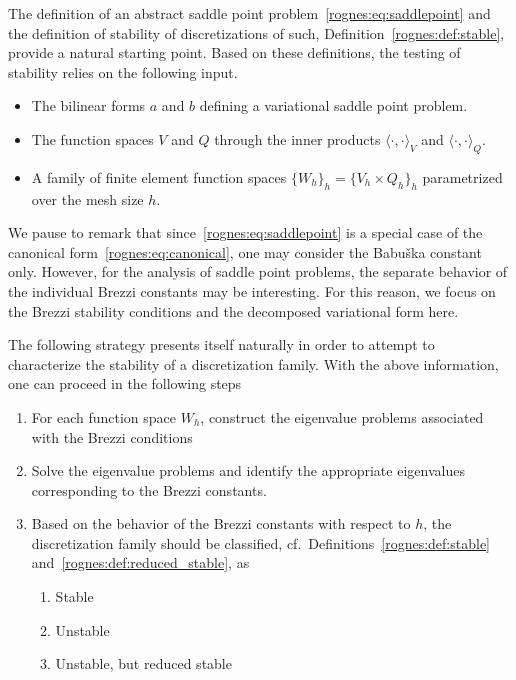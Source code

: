 The definition of an abstract saddle point
problem~\eqref{rognes:eq:saddlepoint} and the definition of stability
of discretizations of such, Definition~\ref{rognes:def:stable},
provide a natural starting point. Based on these definitions, the
testing of stability relies on the following input.
\begin{itemize}
\item The bilinear forms $a$ and $b$ defining a variational
  saddle point problem.
\item The function spaces $V$ and $Q$ through the inner products
  $\langle \cdot, \cdot \rangle_{V}$ and $\langle \cdot, \cdot
  \rangle_{Q}$.
\item A family of finite element function spaces $\{W_h\}_h = \{V_h
  \times Q_h \}_h$ parametrized over the mesh size $h$.
\end{itemize}
We pause to remark that since~\eqref{rognes:eq:saddlepoint} is a special case
of the canonical form~\eqref{rognes:eq:canonical}, one may consider the
Babu\v ska constant only. However, for the analysis of saddle point
problems, the separate behavior of the individual Brezzi constants
may be interesting. For this reason, we focus on the Brezzi stability
conditions and the decomposed variational form here.

The following strategy presents itself naturally in order to attempt
to characterize the stability of a discretization family. With the
above information, one can proceed in the following steps
\begin{enumerate}
\item For each function space $W_h$, construct the eigenvalue problems
  associated with the Brezzi conditions
\item Solve the eigenvalue problems and identify the appropriate
  eigenvalues corresponding to the Brezzi constants.
\item Based on the behavior of the Brezzi constants with respect to
  $h$, the discretization family should be classified,
  cf.~Definitions~\ref{rognes:def:stable} and~\ref{rognes:def:reduced_stable}, as
  \begin{enumerate}
  \item Stable
  \item Unstable
  \item Unstable, but reduced stable
  \end{enumerate}
\end{enumerate}

